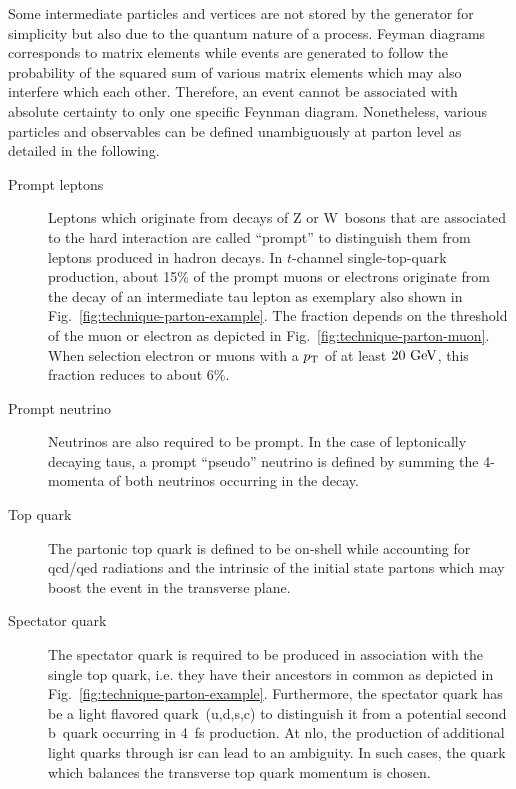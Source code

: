 Some intermediate particles and vertices are not stored by the generator for simplicity but also due to the quantum nature of a process. Feyman diagrams corresponds to matrix elements while events are generated to follow the probability of the squared sum of various matrix elements which may also interfere which each other. Therefore, an event cannot be associated with absolute certainty to only one specific Feynman diagram. Nonetheless, various particles and observables can be defined unambiguously at parton level as detailed in the following.
\begin{description}
\item[Prompt leptons] Leptons which originate from decays of Z or W~bosons that are associated to the hard interaction are called ``prompt'' to distinguish them from leptons produced in hadron decays. In $t$-channel single-top-quark production, about 15\% of the prompt muons or electrons originate from the decay of an intermediate tau lepton as exemplary also shown in Fig.~\ref{fig:technique-parton-example}. The fraction depends on the \pt threshold of the muon or electron as depicted in Fig.~\ref{fig:technique-parton-muon}. When selection electron or muons with a $p_\mathrm{T}$ of at least $20~\mathrm{GeV}$, this fraction reduces to about 6\%.
\item[Prompt neutrino] Neutrinos are also required to be prompt. In the case of leptonically decaying taus, a prompt ``pseudo'' neutrino is defined by summing the 4-momenta of both neutrinos occurring in the decay.
\item[Top quark] The partonic top quark is defined to be on-shell while accounting for \gls{qcd}/\gls{qed} radiations and the intrinsic \kt of the initial state partons which may boost the event in the transverse plane.
\item[Spectator quark] The spectator quark is required to be produced in association with the single top quark, i.e. they have their ancestors in common as depicted in Fig.~\ref{fig:technique-parton-example}. Furthermore, the spectator quark has be a light flavored quark~(u,d,s,c) to distinguish it from a potential second b~quark occurring in 4~\gls{fs} production. At \gls{nlo}, the production of additional light quarks through \gls{isr} can lead to an ambiguity. In such cases, the quark which balances the transverse top quark momentum is chosen.
\end{description}

